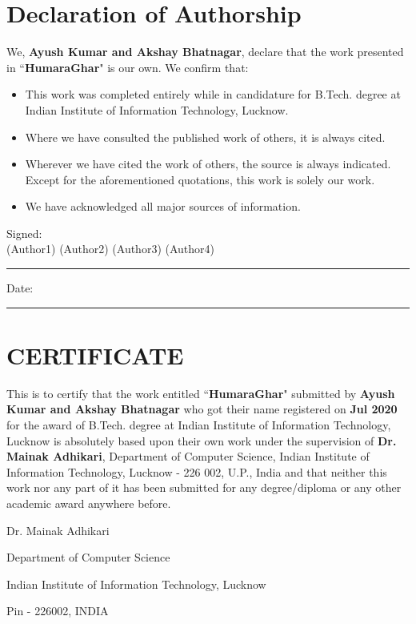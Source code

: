 \thispagestyle{empty}

\setcounter{page}{3}

\chapter*{Declaration of Authorship}

\vspace{1cm}

\noindent
We, \textbf{Ayush Kumar and Akshay Bhatnagar}, declare that the work presented in ``\textbf{HumaraGhar}" is our own. We confirm that:

\medskip

\begin{itemize}
    \item This work was completed entirely while in candidature for B.Tech. degree at Indian Institute of Information Technology, Lucknow.

          \medskip

    \item Where we have consulted the published work of others, it is always cited.

          \medskip

    \item Wherever we have cited the work of others, the source is always indicated. Except for the aforementioned quotations, this work is solely our work.

          \medskip

    \item We have acknowledged all major sources of information.
\end{itemize}

\vspace{2cm}

\noindent Signed:\\

\hspace{1.5cm}(Author1) \hfill (Author2) \hfill (Author3) \hfill (Author4)
\rule[0.5em]{33em}{0.5pt}

\noindent Date:\\
\rule[0.5em]{33em}{0.5pt}

\cleardoublepage

\chapter*{CERTIFICATE}

This is to certify that the work entitled ``\textbf{HumaraGhar}" submitted by \textbf{Ayush Kumar and Akshay Bhatnagar} who got their name registered on \textbf{\;\;\; Jul 2020} for the award of B.Tech. degree at Indian Institute of Information Technology, Lucknow is absolutely based upon their own work under the supervision of \textbf{Dr. Mainak Adhikari}, Department of Computer Science, Indian Institute of Information Technology, Lucknow - 226 002, U.P., India and that neither this work nor any part of it has been submitted for any degree/diploma or any other academic award anywhere before.

\vspace{4cm}

\begin{center}
    Dr. Mainak Adhikari

    Department of Computer Science

    Indian Institute of Information Technology, Lucknow

    Pin - 226002, INDIA
\end{center}
